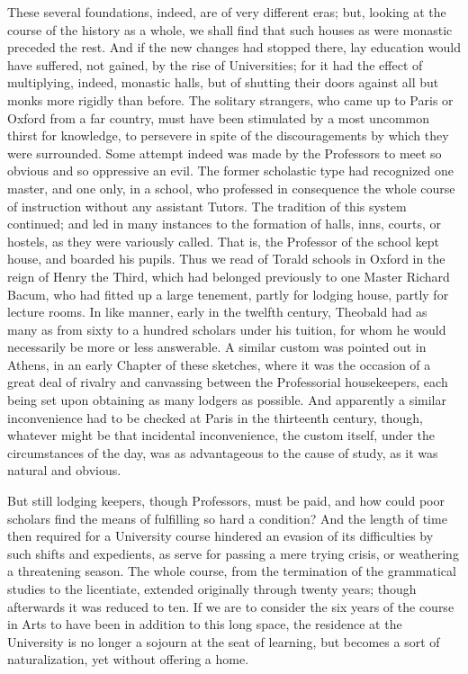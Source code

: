 These several foundations,
indeed, are of very different eras; but, looking at the course of the
history as a whole, we shall find that such houses as were monastic
preceded the rest. And if the new changes had stopped there, lay
education would have suffered, not gained, by the rise of
Universities; for it had the effect of multiplying, indeed, monastic
halls, but of shutting their doors against all but monks more rigidly
than before. The solitary strangers, who came up to Paris or Oxford
from a far country, must have been stimulated by a most uncommon thirst for knowledge, to persevere in spite of the discouragements by
which they were surrounded. Some attempt indeed was made by the
Professors to meet so obvious and so oppressive an evil. The former
scholastic type had recognized one master, and one only, in a school,
who professed in consequence the whole course of instruction without
any assistant Tutors. The tradition of this system continued; and led
in many instances to the formation of halls, inns, courts, or hostels,
as they were variously called. That is, the Professor of the school
kept house, and boarded his pupils. Thus we read of Torald schools in
Oxford in the reign of Henry the Third, which had belonged previously
to one Master Richard Bacum, who had fitted up a large tenement,
partly for lodging house, partly for lecture rooms. In like manner,
early in the twelfth century, Theobald had as many as from sixty to a
hundred scholars under his tuition, for whom he would necessarily be
more or less answerable. A similar custom was pointed out in Athens,
in an early Chapter of these sketches, where it was the occasion of a
great deal of rivalry and canvassing between the Professorial
housekeepers, each being set upon obtaining as many lodgers as
possible. And apparently a similar inconvenience had to be checked at
Paris in the thirteenth century, though, whatever might be that
incidental inconvenience, the custom itself, under the circumstances
of the day, was as advantageous to the cause of study, as it was
natural and obvious.

But still lodging keepers,
though Professors, must be paid, and how could poor scholars find the
means of fulfilling so hard a condition? And the length of time then
required for a University course hindered an evasion of its
difficulties by such shifts and expedients, as serve for passing a
mere trying crisis, or weathering a threatening season. The
whole course, from the termination of the grammatical studies to the
licentiate, extended originally through twenty years; though
afterwards it was reduced to ten. If we are to consider the six years
of the course in Arts to have been in addition to this long space, the
residence at the University is no longer a sojourn at the seat of
learning, but becomes a sort of naturalization, yet without offering a
home.

